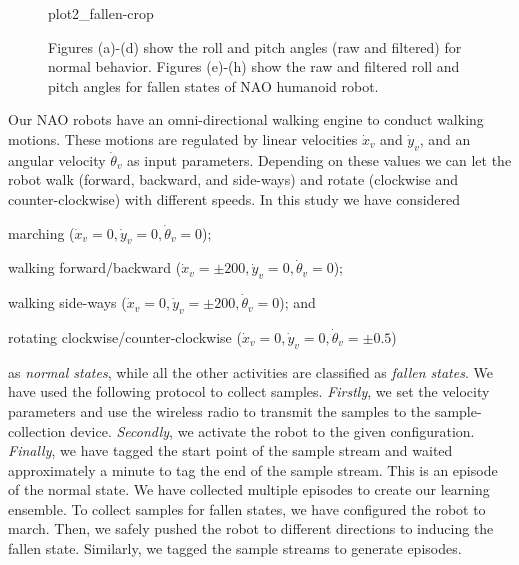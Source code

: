\documentclass[letterpaper]{article}
\begin{document}
\begin{sloppy}
\begin{figure}[!ht]
{       {plot2_fallen-crop}}
  \caption{Figures (a)-(d) show the roll and pitch angles (raw and filtered) for normal 
behavior. Figures (e)-(h) show the raw and filtered roll and pitch angles for fallen 
states of NAO humanoid robot.}
  \label{fig:normalFallenBehavior}

\end{figure}

Our NAO robots have an omni-directional walking engine to conduct walking motions.  
These motions are regulated by linear velocities $\dot{x}_v$ and $\dot{y}_v$, and an 
angular velocity $\dot{\theta}_v$ as input parameters. Depending on these
values we can let the robot walk (forward, backward, and side-ways) and rotate (clockwise and
counter-clockwise) with different speeds. In this study we have considered \begin{inparaenum}[(1)]
\item marching ($\dot{x}_v = 0 , \dot{y}_v = 0, \dot{\theta}_v = 0$); \item walking  
forward/backward ($\dot{x}_v = \pm200
, \dot{y}_v = 0, \dot{\theta}_v = 0$);  \item walking side-ways ($\dot{x}_v = 0, \dot{y}_v = 
\pm200, \dot{\theta}_v = 0$); and  \item rotating clockwise/counter-clockwise
($\dot{x}_v = 0 , \dot{y}_v = 0, \dot{\theta}_v = \pm 0.5$) \end{inparaenum} as {\em normal states}, 
while all the other activities are classified as {\em fallen states}. We have used the  
following protocol to collect samples. \textit{Firstly}, we set the velocity parameters and use the wireless 
radio to transmit the samples to the sample-collection device. \textit{Secondly}, we activate the robot to 
the given configuration. \textit{Finally}, we have tagged the start point of the sample stream and waited 
approximately a minute to tag the end of the sample stream. This is an episode of the normal state. 
We have collected multiple episodes to create our learning ensemble. To collect samples for fallen 
states, we have configured the robot to march. Then, we safely pushed the robot to 
different directions to inducing the fallen state. Similarly, we tagged the sample streams to 
generate episodes.    


\end{sloppy}
\end{document}

